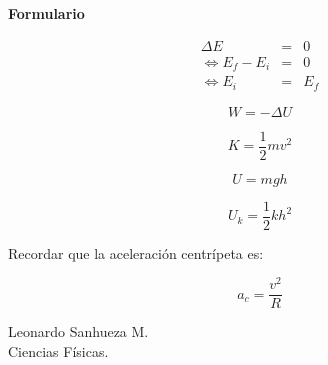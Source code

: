 \documentclass[12pt]{article}
\begin{document}
\textbf{\huge{Formulario}}

\begin{eqnarray}
\Delta E &=& 0 \\
\Leftrightarrow E_{f} - E_{i} &=& 0 \\
\Leftrightarrow E_{i} &=&  E_{f} 
\end{eqnarray}
 
\begin{equation}
W= - \Delta U
\end{equation}

\begin{equation}
K= \frac{1}{2} m v^2
\end{equation}


\begin{equation}
U= mgh
\end{equation}


\begin{equation}
U_{k}= \frac{1}{2} k h^2
\end{equation}

Recordar que la aceleración centrípeta es:

\begin{equation}
a_{c} = \frac{v^2}{R}
\end{equation}

Leonardo Sanhueza M. \\
Ciencias Físicas.
\end{document}
